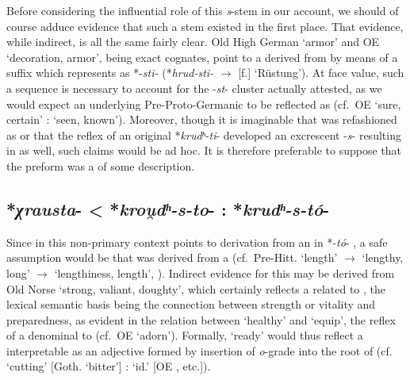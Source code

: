 \documentclass[output=paper,colorlinks,citecolor=brown]{langscibook}
\begin{document}
Before considering the influential role of this \textit{s}-stem in our account, we should of course adduce evidence that such a stem existed in the first place. That evidence, while indirect, is all the same fairly clear. Old High German  ‘armor’ and OE  ‘decoration, armor’, being exact cognates, point to a  derived from  by means of a suffix which \citet[275]{Seebold1970} represents as *-\textit{sti-} (*\textit{hrud-sti-} $\rightarrow$  [f.] ‘Rüstung’). At face value, such a sequence is necessary to account for the -\textit{st}- cluster actually attested, as we would expect an underlying Pre-Proto-Germanic  to be reflected as  (cf.\ OE  ‘sure, certain’ :  ‘seen, known’). Moreover, though it is imaginable that  was refashioned as  or that the reflex of an original *\textit{krudʰ-ti}- developed an excrescent -\textit{s}- resulting in  as well, such claims would be ad hoc. It is therefore preferable to suppose that the preform was a  of some description.

\subsection{*\textit{χrausta}- < *\textit{krou̯dʰ-s-to}- : *\textit{krudʰ-s-tó}-}

Since  in this non-primary context points to derivation from an  in *-\textit{tó}-  \citep[390]{Schindler1980}, a safe assumption would be that  was derived from a  (cf.\ Pre-Hitt.  ‘length’ $\rightarrow$  ‘lengthy, long’ $\rightarrow$  ‘lengthiness, length’, \citealt[148]{Jasanoff2004}). Indirect evidence for this  may be derived from Old Norse  ‘strong, valiant, doughty’, which certainly reflects a  related to  \citep[174]{Hill2003}, the lexical semantic basis being the connection between strength or vitality and preparedness, as evident in the relation between  ‘healthy’ and  ‘equip’, the reflex of a denominal  to  (cf.\ OE  ‘adorn’). Formally,  ‘ready’ would thus reflect a  interpretable as an adjective formed by insertion of \textit{o}-grade into the root of  (cf.\  ‘cutting’ [Goth.  ‘bitter’] :  ‘id.’ [OE , etc.]).
\end{document}
